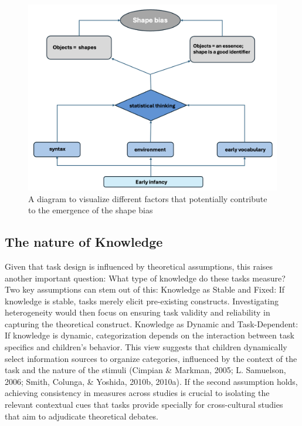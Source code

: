 \documentclass[10pt, letterpaper]{article}
\newenvironment{CodeChunk}{}{}
\begin{document}
\begin{CodeChunk}
\begin{figure}[tb]
\includegraphics[width=1\linewidth]{conceptual_diagram1} \caption[A diagram to visualize different factors that potentially contribute to the emergence of the shape bias]{A diagram to visualize different factors that potentially contribute to the emergence of the shape bias}\label{fig:flow_diagram }
\end{figure}
\end{CodeChunk}

\hypertarget{the-nature-of-knowledge}{%
\subsection{The nature of Knowledge}\label{the-nature-of-knowledge}}

Given that task design is influenced by theoretical assumptions, this
raises another important question: What type of knowledge do these tasks
measure? Two key assumptions can stem out of this: Knowledge as Stable
and Fixed: If knowledge is stable, tasks merely elicit pre-existing
constructs. Investigating heterogeneity would then focus on ensuring
task validity and reliability in capturing the theoretical construct.
Knowledge as Dynamic and Task-Dependent: If knowledge is dynamic,
categorization depends on the interaction between task specifics and
children's behavior. This view suggests that children dynamically select
information sources to organize categories, influenced by the context of
the task and the nature of the stimuli (Cimpian \& Markman, 2005; L.
Samuelson, 2006; Smith, Colunga, \& Yoshida, 2010b, 2010a). If the
second assumption holds, achieving consistency in measures across
studies is crucial to isolating the relevant contextual cues that tasks
provide specially for cross-cultural studies that aim to adjudicate
theoretical debates.
\end{document}
